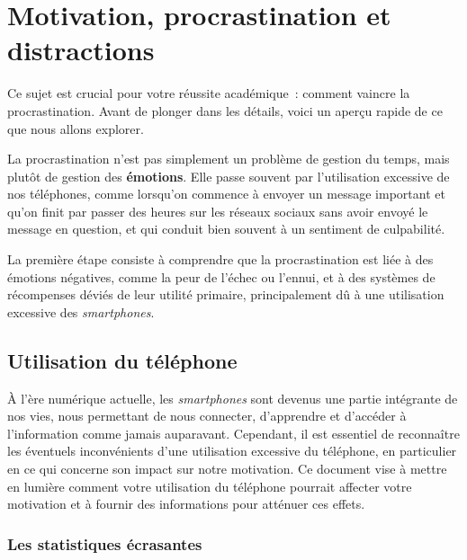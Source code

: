 \documentclass[a4paper, 12pt, garamond]{book}
\begin{document}
\setcounter{chapter}{0}

\chapter{Motivation, procrastination et distractions}




Ce sujet est crucial pour votre réussite académique~: comment vaincre la
procrastination. Avant de plonger dans les détails, voici un aperçu rapide de ce
que nous allons explorer.

La procrastination n'est pas simplement un problème de gestion du temps, mais
plutôt de gestion des \textbf{émotions}. Elle passe souvent par l'utilisation
excessive de nos téléphones, comme lorsqu'on commence à envoyer un message
important et qu'on finit par passer des heures sur les réseaux sociaux sans
avoir envoyé le message en question, et qui conduit bien souvent à un sentiment
de culpabilité.

La première étape consiste à comprendre que la procrastination est liée à des
émotions négatives, comme la peur de l'échec ou l'ennui, et à des systèmes de
récompenses déviés de leur utilité primaire, principalement dû à une utilisation
excessive des \textit{smartphones}.

\section{Utilisation du téléphone}

À l'ère numérique actuelle, les \textit{smartphones} sont devenus une partie
intégrante de nos vies, nous permettant de nous connecter, d'apprendre et
d'accéder à l'information comme jamais auparavant. Cependant, il est essentiel
de reconnaître les éventuels inconvénients d'une utilisation excessive du
téléphone, en particulier en ce qui concerne son impact sur notre motivation. Ce
document vise à mettre en lumière comment votre utilisation du téléphone
pourrait affecter votre motivation et à fournir des informations pour atténuer
ces effets.

\subsection{Les statistiques écrasantes}
\end{document}

